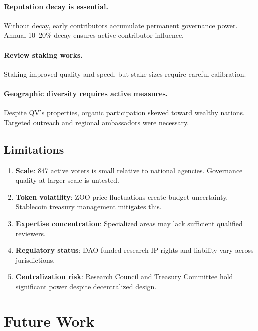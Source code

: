 \documentclass[11pt,a4paper]{article}
\newcommand{\ZOO}{\textsc{ZOO}}
\begin{document}
\paragraph{Reputation decay is essential.} Without decay, early
contributors accumulate permanent governance power. Annual 10--20\% decay
ensures active contributor influence.

\paragraph{Review staking works.} Staking improved quality and speed,
but stake sizes require careful calibration.

\paragraph{Geographic diversity requires active measures.} Despite QV's
properties, organic participation skewed toward wealthy nations. Targeted
outreach and regional ambassadors were necessary.

\subsection{Limitations}

\begin{enumerate}
  \item \textbf{Scale}: 847 active voters is small relative to national
    agencies. Governance quality at larger scale is untested.
  \item \textbf{Token volatility}: \ZOO{} price fluctuations create
    budget uncertainty. Stablecoin treasury management mitigates this.
  \item \textbf{Expertise concentration}: Specialized areas may lack
    sufficient qualified reviewers.
  \item \textbf{Regulatory status}: DAO-funded research IP rights and
    liability vary across jurisdictions.
  \item \textbf{Centralization risk}: Research Council and Treasury
    Committee hold significant power despite decentralized design.
\end{enumerate}


\section{Future Work}
\label{sec:future}
\end{document}
